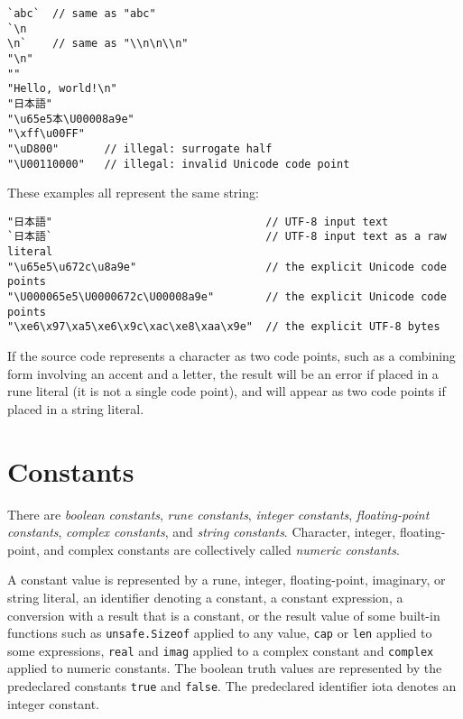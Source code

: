 \begin{Verbatim}[frame=single]
`abc`  // same as "abc"
`\n
\n`    // same as "\\n\n\\n"
"\n"
""
"Hello, world!\n"
"日本語"
"\u65e5本\U00008a9e"
"\xff\u00FF"
"\uD800"       // illegal: surrogate half
"\U00110000"   // illegal: invalid Unicode code point
\end{Verbatim}

These examples all represent the same string:

\begin{Verbatim}[frame=single]
"日本語"                                 // UTF-8 input text
`日本語`                                 // UTF-8 input text as a raw literal
"\u65e5\u672c\u8a9e"                    // the explicit Unicode code points
"\U000065e5\U0000672c\U00008a9e"        // the explicit Unicode code points
"\xe6\x97\xa5\xe6\x9c\xac\xe8\xaa\x9e"  // the explicit UTF-8 bytes
\end{Verbatim}

If the source code represents a character as two code points, such as a
combining form involving an accent and a letter, the result will be an
error if placed in a rune literal (it is not a single code point), and
will appear as two code points if placed in a string literal.

\section*{Constants}

There are \emph{boolean constants}, \emph{rune constants}, \emph{integer
constants}, \emph{floating-point constants}, \emph{complex constants},
and \emph{string constants}. Character, integer, floating-point, and
complex constants are collectively called \emph{numeric constants}.

A constant value is represented by a rune, integer, floating-point,
imaginary, or string literal, an identifier denoting a constant, a
constant expression, a conversion with a result that is a constant,
or the result value of some built-in functions such as
\texttt{unsafe.Sizeof} applied to any value, \texttt{cap} or
\texttt{len} applied to some expressions, \texttt{real} and
\texttt{imag} applied to a complex constant and \texttt{complex}
applied to numeric constants. The boolean truth values are represented
by the predeclared constants \texttt{true} and \texttt{false}. The
predeclared identifier iota denotes an integer constant.

